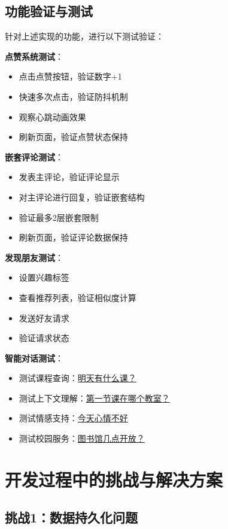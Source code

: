 \documentclass[12pt,a4paper]{article}
\begin{document}
\subsection{功能验证与测试}

针对上述实现的功能，进行以下测试验证：

\textbf{点赞系统测试}：
\begin{itemize}
    \item 点击点赞按钮，验证数字+1
    \item 快速多次点击，验证防抖机制
    \item 观察心跳动画效果
    \item 刷新页面，验证点赞状态保持
\end{itemize}

\textbf{嵌套评论测试}：
\begin{itemize}
    \item 发表主评论，验证评论显示
    \item 对主评论进行回复，验证嵌套结构
    \item 验证最多2层嵌套限制
    \item 刷新页面，验证评论数据保持
\end{itemize}

\textbf{发现朋友测试}：
\begin{itemize}
    \item 设置兴趣标签
    \item 查看推荐列表，验证相似度计算
    \item 发送好友请求
    \item 验证请求状态
\end{itemize}

\textbf{智能对话测试}：
\begin{itemize}
    \item 测试课程查询：\url{明天有什么课？}
    \item 测试上下文理解：\url{第一节课在哪个教室？}
    \item 测试情感支持：\url{今天心情不好}
    \item 测试校园服务：\url{图书馆几点开放？}
\end{itemize}

\section{开发过程中的挑战与解决方案}

\subsection{挑战1：数据持久化问题}
\end{document}
